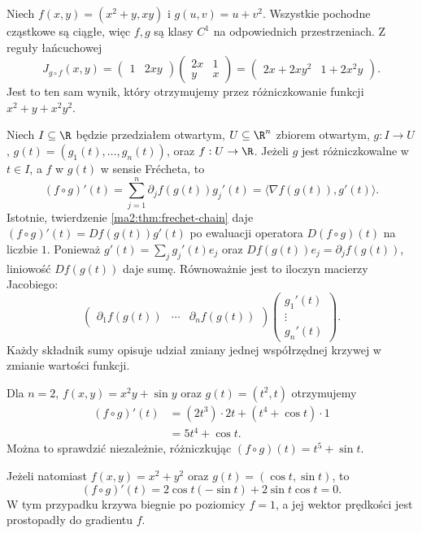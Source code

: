\begin{przyklad}
Niech $f(x,y)=(x^2+y,xy)$ i $g(u,v)=u+v^2$.
Wszystkie pochodne cząstkowe są ciągłe, więc
$f,g$ są klasy $C^1$ na odpowiednich przestrzeniach.
Z reguły łańcuchowej
\[
 J_{g\circ f}(x,y)
 =\begin{pmatrix}1&2xy\end{pmatrix}
  \begin{pmatrix}2x&1\\y&x\end{pmatrix}
 =\begin{pmatrix}2x+2xy^2&1+2x^2y\end{pmatrix}.
\]
Jest to ten sam wynik, który otrzymujemy przez
różniczkowanie funkcji $x^2+y+x^2y^2$.
\end{przyklad}

\begin{przyklad}
\label{ma2:ex:chain-curve}
Niech $I\subseteq\R$ będzie przedziałem otwartym,
$U\subseteq\R^n$ zbiorem otwartym,
$g:I\to U$, $g(t)=(g_1(t),\ldots,g_n(t))$,
oraz $f:U\to\R$. Jeżeli $g$ jest różniczkowalne
w $t\in I$, a $f$ w $g(t)$ w sensie Frécheta, to
\[
 (f\circ g)'(t)=
 \sum_{j=1}^n\partial_j f(g(t))g_j'(t)
 =\langle\nabla f(g(t)),g'(t)\rangle.
\]
Istotnie, twierdzenie \ref{ma2:thm:frechet-chain}
daje $(f\circ g)'(t)=Df(g(t))g'(t)$ po ewaluacji
operatora $D(f\circ g)(t)$ na liczbie $1$.
Ponieważ $g'(t)=\sum_j g_j'(t)e_j$ oraz
$Df(g(t))e_j=\partial_j f(g(t))$, liniowość
$Df(g(t))$ daje sumę. Równoważnie jest to iloczyn
macierzy Jacobiego:
\[
 \begin{pmatrix}
 \partial_1 f(g(t))&\cdots&\partial_n f(g(t))
 \end{pmatrix}
 \begin{pmatrix}g_1'(t)\\ \vdots\\g_n'(t)\end{pmatrix}.
\]
Każdy składnik sumy opisuje udział zmiany jednej
współrzędnej krzywej w zmianie wartości funkcji.

Dla $n=2$, $f(x,y)=x^2y+\sin y$ oraz
$g(t)=(t^2,t)$ otrzymujemy
\[
 \begin{aligned}
 (f\circ g)'(t)
 &= (2t^3)\cdot 2t+(t^4+\cos t)\cdot1\\
 &=5t^4+\cos t.
 \end{aligned}
\]
Można to sprawdzić niezależnie, różniczkując
$(f\circ g)(t)=t^5+\sin t$.

Jeżeli natomiast $f(x,y)=x^2+y^2$ oraz
$g(t)=(\cos t,\sin t)$, to
\[
 (f\circ g)'(t)=2\cos t(-\sin t)+2\sin t\cos t=0.
\]
W tym przypadku krzywa biegnie po poziomicy
$f=1$, a jej wektor prędkości jest prostopadły
do gradientu $f$.
\end{przyklad}

